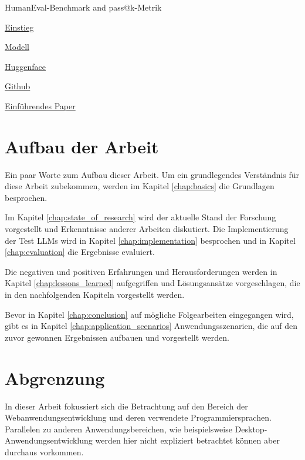 HumanEval-Benchmark and pass@k-Metrik

\href{https://deepgram.com/learn/humaneval-llm-benchmark}{Einstieg}

\href{https://paperswithcode.com/sota/code-generation-on-humaneval}{Modell}

\href{https://huggingface.co/datasets/openai/openai_humaneval}{Huggenface}

\href{https://github.com/openai/human-eval/tree/master}{Github}

\href{https://arxiv.org/abs/2107.03374}{Einführendes Paper}


\section{Aufbau der Arbeit}
Ein paar Worte zum Aufbau dieser Arbeit. Um ein grundlegendes Verständnis für diese Arbeit zubekommen, werden im Kapitel \ref{chap:basics} die Grundlagen besprochen.\vspace{0.2cm}

Im Kapitel \ref{chap:state_of_research} wird der aktuelle Stand der Forschung vorgestellt und Erkenntnisse anderer Arbeiten diskutiert. Die Implementierung der Test LLMs wird in Kapitel \ref{chap:implementation} besprochen und in Kapitel \ref{chap:evaluation} die Ergebnisse evaluiert.\vspace{0.2cm}

Die negativen und positiven Erfahrungen und Herausforderungen werden in Kapitel \ref{chap:lessons_learned} aufgegriffen und Lösungsansätze vorgeschlagen, die in den nachfolgenden Kapiteln vorgestellt werden.\vspace{0.2cm}

Bevor in Kapitel \ref{chap:conclusion} auf mögliche Folgearbeiten eingegangen wird, gibt es in Kapitel \ref{chap:application_scenarios} Anwendungsszenarien, die auf den zuvor gewonnen Ergebnissen aufbauen und vorgestellt werden.


\section{Abgrenzung}
In dieser Arbeit fokussiert sich die Betrachtung auf den Bereich der Webanwendungsentwicklung und deren verwendete Programmiersprachen. Parallelen zu anderen Anwendungsbereichen, wie beispielsweise Desktop-Anwendungsentwicklung werden hier nicht expliziert betrachtet können aber durchaus vorkommen.\vspace{0.2cm}

